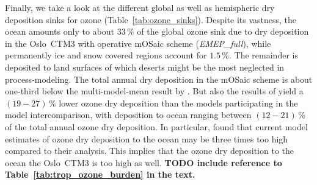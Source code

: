 \documentclass[gmd, manuscript]{copernicus}
\begin{document}
Finally, we take a look at the different global as well as hemispheric dry deposition sinks for ozone (Table~\ref{tab:ozone_sinks}). Despite its vastness, the ocean amounts only to about $33\,\unit{\%}$ of the global ozone sink due to dry deposition in the Oslo~CTM3 with operative mOSaic scheme (\emph{EMEP\_full}), while permanently ice and snow covered regions account for $1.5\,\unit{\%}$. The remainder is deposited to land surfaces of which deserts might be the most neglected in process-modeling. The total annual dry deposition in the mOSaic scheme is about one-third below the multi-model-mean result by \citet{ACP:Hardacre2015}. But also the results of \citet{ACP:Luhar2017, ACP:Luhar2018} yield a $(19-27)\,\unit{\%}$ lower ozone dry deposition than the models participating in the model intercomparison, with deposition to ocean ranging between $(12-21)\,\unit{\%}$ of the total annual ozone dry deposition. In particular, \citet{ACP:Luhar2018} found that current model estimates of ozone dry deposition to the ocean may be three times too high compared to their analysis. This implies that the ozone dry deposition to the ocean the Oslo~CTM3 is too high as well. {\bf TODO include reference to Table~\ref{tab:trop_ozone_burden} in the text.}
%
\end{document}
